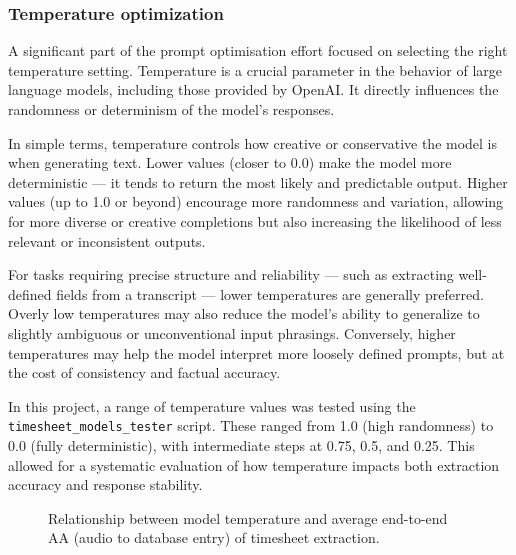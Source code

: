 \documentclass[
  digital,     %
  oneside,     %
  nosansbold,  %
  nocolorbold, %
  lof,         %
  lot,         %
]{fithesis4}
\begin{document}
\subsubsection{Temperature optimization}

A significant part of the prompt optimisation effort focused on selecting the right temperature setting. Temperature is a crucial parameter in the behavior of large language models, including those provided by OpenAI. It directly influences the randomness or determinism of the model's responses.

In simple terms, temperature controls how creative or conservative the model is when generating text. Lower values (closer to 0.0) make the model more deterministic — it tends to return the most likely and predictable output. Higher values (up to 1.0 or beyond) encourage more randomness and variation, allowing for more diverse or creative completions but also increasing the likelihood of less relevant or inconsistent outputs.

For tasks requiring precise structure and reliability — such as extracting well-defined fields from a transcript — lower temperatures are generally preferred. Overly low temperatures may also reduce the model's ability to generalize to slightly ambiguous or unconventional input phrasings. Conversely, higher temperatures may help the model interpret more loosely defined prompts, but at the cost of consistency and factual accuracy.

In this project, a range of temperature values was tested using the \texttt{timesheet\_models\_tester} script. These ranged from 1.0 (high randomness) to 0.0 (fully deterministic), with intermediate steps at 0.75, 0.5, and 0.25. This allowed for a systematic evaluation of how temperature impacts both extraction accuracy and response stability.

\begin{figure}[ht]
    \centering
    \caption{Relationship between model temperature and average end-to-end \gls{AA} (audio to database entry) of timesheet extraction.}
    \label{fig:temp_vs_accuracy}
\end{figure}
\end{document}
